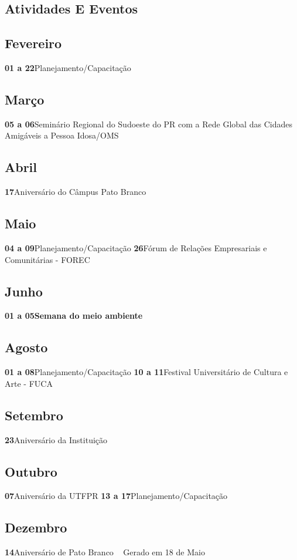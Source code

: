 \documentclass[thesis]{hmcposter}
\begin{document}
\begin{poster}
\normalsize \section{\color{hmcorange}Atividades E Eventos}\subsection{Fevereiro}\textbf{01 a 22}\quad \quad Planejamento/Capacitação \newline\subsection{Março}\textbf{05 a 06}\quad \quad Seminário Regional do Sudoeste do PR com a Rede Global das Cidades Amigáveis a Pessoa Idosa/OMS \newline\subsection{Abril}\textbf{17}\quad \quad \quad \quad Aniversário do Câmpus Pato Branco \newline\subsection{Maio}\textbf{04 a 09}\quad \quad Planejamento/Capacitação \newline\textbf{26}\quad \quad \quad \quad Fórum de Relações Empresariais e Comunitárias - FOREC \newline\subsection{Junho}\textbf{01 a 05}\quad \quad \textbf{Semana do meio ambiente} \newline\subsection{Agosto}\textbf{01 a 08}\quad \quad Planejamento/Capacitação \newline\textbf{10 a 11}\quad \quad Festival Universitário de Cultura e Arte - FUCA \newline\subsection{Setembro}\textbf{23}\quad \quad \quad \quad Aniversário da Instituição \newline\subsection{Outubro}\textbf{07}\quad \quad \quad \quad Aniversário da UTFPR \newline\textbf{13 a 17}\quad \quad Planejamento/Capacitação \newline\subsection{Dezembro}\textbf{14}\quad \quad \quad \quad Aniversário de Pato Branco \newline ~ \vfill \hfill \small \color{hmcorange}Gerado em 18 de Maio \end{poster}
\end{document}
